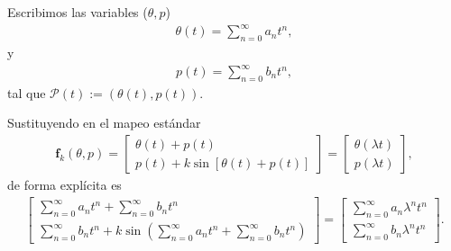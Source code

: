 \documentclass[11pt]{beamer}
\theoremstyle{definition}
\begin{document}
\begin{frame}
Escribimos las variables ($\theta,p$) 
\begin{eqnarray}
\theta(t)=\sum_{n=0}^{\infty}a_{n}t^{n}  ,
\label{theta}
\end{eqnarray}
y
\begin{eqnarray}
p(t)=\sum_{n=0}^{\infty}b_{n}t^{n},
\label{p}
\end{eqnarray}
tal que $\mathcal{P}(t):=(\theta(t),p(t))$.
\end{frame}
\begin{frame}
Sustituyendo en el mapeo est\'andar
\begin{eqnarray}
\mathbf{f}_{k}(\theta,p) = \left[\begin{array}{c}
\theta(t) + p(t) \\
p(t) + k\sin[\theta(t) +p(t)]
\end{array}\right] =\left[ \begin{array}{c}
\theta(\lambda t) \\
p(\lambda t)
\end{array}\right], 
\label{sumas en mapeo}
\end{eqnarray}
de forma expl\'icita es
\begin{eqnarray}
\left[\begin{array}{c}
\sum_{n=0}^{\infty}a_{n}t^{n} + \sum_{n=0}^{\infty}b_{n}t^{n} \\
\sum_{n=0}^{\infty}b_{n}t^{n} + k\sin(\sum_{n=0}^{\infty}a_{n}t^{n} + \sum_{n=0}^{\infty}b_{n}t^{n})
\end{array}\right] =\left[ \begin{array}{c}
\sum_{n=0}^{\infty}a_{n}\lambda^{n}t^{n} \\
\sum_{n=0}^{\infty}b_{n}\lambda^{n}t^{n}
\end{array}\right].
\label{expandida}
\end{eqnarray}

\end{frame}
\end{document}

